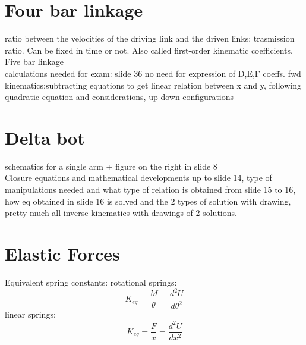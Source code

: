 \documentclass{book}
\begin{document}
\section{Four bar linkage}
ratio between the velocities of the driving link and the driven links: trasmission ratio. Can be fixed in time or not. Also called first-order kinematic coefficients.
\\Five bar linkage\\
calculations needed for exam: slide 36 no need for expression of D,E,F coeffs.
fwd kinematics:subtracting equations to get linear relation between x and y, following quadratic equation and considerations, up-down configurations








\section{Delta bot}
schematics for a single arm + figure on the right in slide 8\\
Closure equations and mathematical developments up to slide 14, type of manipulations needed and what type of relation is obtained from slide 15 to 16, how eq obtained in slide 16 is solved and the 2 types of solution with drawing, pretty much all inverse kinematics with drawings of 2 solutions.
\section{Elastic Forces}
Equivalent spring constants:
rotational springs:
\[
    K_{eq}=\frac{M}{\theta}=\frac{d^2U}{d\theta^2}
\]
linear springs:
\[
    K_{eq}=\frac{F}{x}=\frac{d^2U}{dx^2}
\]
\end{document}
